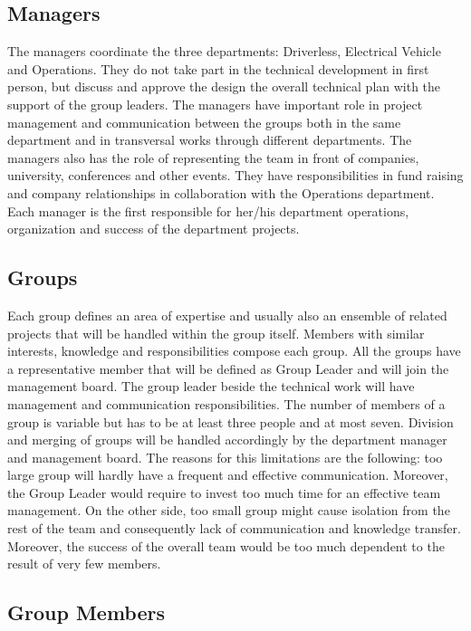 \documentclass[graybox]{svmult}
\begin{document}
\subsection{Managers}
The managers coordinate the three departments: Driverless, Electrical Vehicle and Operations. They do not take part in the technical development in first person, but discuss and approve the design the overall technical plan with the support of the group leaders.
The managers have important role in project management and communication between the groups both in the same department and in transversal works through different departments.
The managers also has the role of representing the team in front of companies, university, conferences and other events.
They have responsibilities in fund raising and company relationships in collaboration with the Operations department.
Each manager is the first responsible for her/his department operations, organization and success of the department projects.

\subsection{Groups}
Each group defines an area of expertise and usually also an ensemble of related projects that will be handled within the group itself. Members with similar interests, knowledge and responsibilities compose each group. All the groups have a representative member that will be defined as Group Leader and will join the management board. The group leader beside the technical work will have management and communication responsibilities.
The number of members of a group is variable but has to be at least three people and at most seven. Division and merging of groups will be handled accordingly by the department manager and management board. The reasons for this limitations are the following: too large group will hardly have a frequent and effective communication. Moreover, the Group Leader would require to invest too much time for an effective team management.
On the other side, too small group might cause isolation from the rest of the team and consequently lack of communication and knowledge transfer. Moreover, the success of the overall team would be too much dependent to the result of very few members.

\subsection{Group Members}
\end{document}

